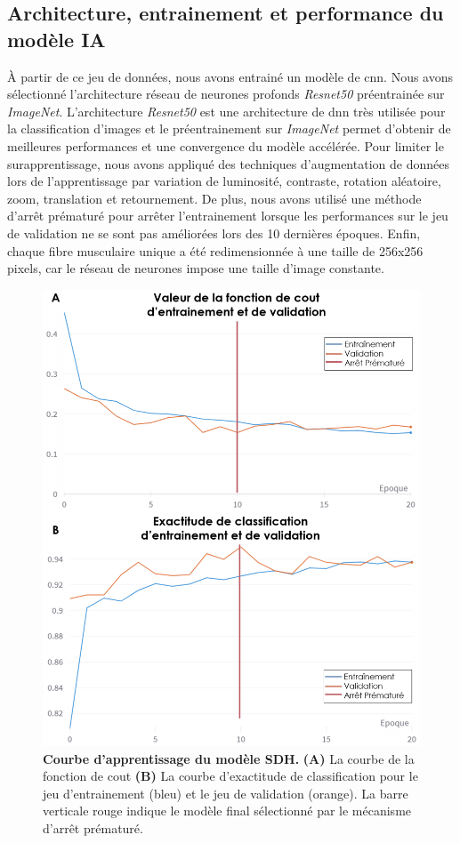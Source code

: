 \subsection{Architecture, entrainement et performance du modèle IA}
À partir de ce jeu de données, nous avons entrainé un modèle de \gls{cnn}. Nous avons sélectionné l'architecture réseau de neurones profonds \textit{Resnet50} préentrainée sur \textit{ImageNet}. L'architecture \textit{Resnet50} est une architecture de \gls{dnn} très utilisée pour la classification d'images et le préentrainement sur \textit{ImageNet} permet d'obtenir de meilleures performances et une convergence du modèle accélérée. Pour limiter le surapprentissage, nous avons appliqué des techniques d'augmentation de données lors de l'apprentissage par variation de luminosité, contraste, rotation aléatoire, zoom, translation et retournement. De plus, nous avons utilisé une méthode d'arrêt prématuré pour arrêter l'entrainement lorsque les performances sur le jeu de validation ne se sont pas améliorées lors des 10 dernières époques. Enfin, chaque fibre musculaire unique a été redimensionnée à une taille de 256x256 pixels, car le réseau de neurones impose une taille d'image constante.
\begin{figure}[!ht]
 \centering
 \includegraphics[width=1\textwidth]{figures/training_sdh.png}
 \caption[Courbe d'apprentissage du modèle SDH]{\textbf{Courbe d'apprentissage du modèle SDH.} \textbf{(A)} La courbe de la fonction de cout \textbf{(B)}  La courbe d'exactitude de classification pour le jeu d'entrainement (bleu) et le jeu de validation (orange). La barre verticale rouge indique le modèle final sélectionné par le mécanisme d’arrêt prématuré.}
 \label{fig:sdh_train}
\end{figure}

